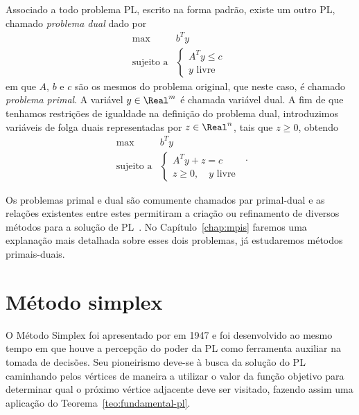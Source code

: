 Associado a todo problema \ac{PL}, escrito na forma padrão, existe um outro \ac{PL}, chamado \emph{problema dual} dado por
\begin{equation*}
\begin{array}{lc}
\displaystyle \max & b^Ty \\
\text{sujeito a} &\begin{cases} A^Ty \leq c \\
				 y \text{ livre}	
				 \end{cases}\
\end{array}
\end{equation*}
em que $A$, $b$ e $c$ são os mesmos do problema original, que neste caso, é chamado \emph{problema primal}.
A variável $y\in\Real^{m}$ é chamada variável dual. A fim de que tenhamos restrições de igualdade na definição do problema dual, introduzimos  variáveis de folga duais representadas por $z\in\Real^{n}$, tais que $z\geq 0$, obtendo 
\begin{equation}
\begin{array}{lc}
\displaystyle \max & b^Ty \\
\text{sujeito a} &\begin{cases} A^Ty +z =  c \\
				 z\geq 0, \quad y \text{ livre}	
				 \end{cases}\
\end{array}.
\label{eq:introPL-dual}
\end{equation}


Os problemas primal e dual são comumente chamados par primal-dual e as relações existentes entre estes permitiram a criação ou refinamento de diversos métodos para a solução de \ac{PL}~\cite{Bazaraa:2009uu}. No Capítulo~\ref{chap:mpis} faremos uma explanação mais detalhada sobre esses dois problemas, já estudaremos métodos primais-duais.

\section{Método simplex}


O Método Simplex foi apresentado por
\textcite{Dantzig:Maximization-of-a-linear:1951y} em 1947 e foi desenvolvido ao
mesmo tempo em que houve a percepção do poder da \ac{PL} como ferramenta auxiliar na
tomada de decisões. Seu pioneirismo deve-se à busca da solução do \ac{PL}
caminhando pelos vértices de maneira a utilizar o valor da função objetivo para determinar qual o próximo vértice adjacente deve ser
visitado, fazendo assim uma aplicação do Teorema~\ref{teo:fundamental-pl}.

